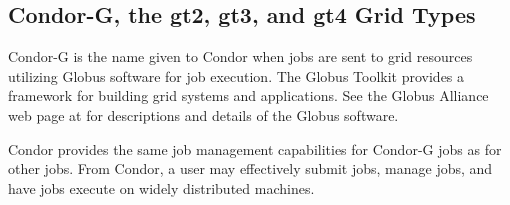 
\subsection{\label{sec:Condor-G}Condor-G, the gt2, gt3, and gt4 Grid Types}

Condor-G is the name given to Condor when 
 jobs are sent to grid resources utilizing
Globus software for job execution.
The Globus Toolkit provides a framework for building grid systems
and applications.
See the Globus Alliance web page at
for descriptions and details of the Globus software.

Condor provides the same job management capabilities for Condor-G
jobs as for other jobs.
From Condor, a user may effectively submit jobs, manage jobs,
and have jobs execute on widely distributed machines.



